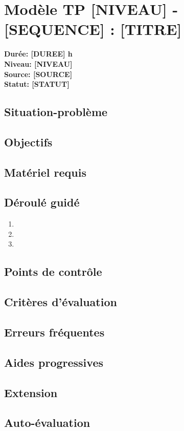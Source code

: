 \documentclass[a4paper,11pt]{article}
\begin{document}
\section*{Modèle TP [NIVEAU] - [SEQUENCE] : [TITRE]}
\textbf{Durée: [DUREE] h}\\
\textbf{Niveau: [NIVEAU]}\\
\textbf{Source: [SOURCE]}\\
\textbf{Statut: [STATUT]}

\subsection*{Situation-problème}

\subsection*{Objectifs}

\subsection*{Matériel requis}

\subsection*{Déroulé guidé}
\begin{enumerate}
  \item
  \item
  \item
\end{enumerate}

\subsection*{Points de contrôle}

\subsection*{Critères d'évaluation}

\subsection*{Erreurs fréquentes}

\subsection*{Aides progressives}

\subsection*{Extension}

\subsection*{Auto-évaluation}
\end{document}
